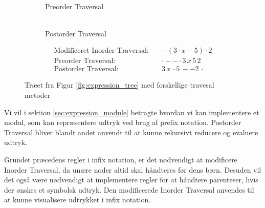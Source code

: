 \begin{figure}[H]
\begin{subfigure}{0.3\textwidth}
    \caption{\\Preorder Traversal}
  \end{subfigure}
  \hfill
  \begin{subfigure}{0.3\textwidth}
    \centering
    \caption{\\Postorder Traversal}
  \end{subfigure}
  \begin{align*}
      \text{Modificeret Inorder Traversal:} \quad & - (3 \cdot x - 5) \cdot 2 \\
      \text{Preorder Traversal:} \quad &  \cdot - - \cdot 3\, x\, 5\, 2  \\
      \text{Postorder Traversal:} \quad & 3\, x\, \cdot 5\, - -  2\, \cdot
  \end{align*}
  \caption{Træet fra Figur \ref{fig:expression_tree} med forskellige travesal metoder}
  \label{fig:expression_tree_traversal}
\end{figure}


Vi vil i sektion \ref{sec:expression_module} betragte hvordan vi kan implementere et modul, som kan repræsentere udtryk ved brug af prefix notation.
Postorder Traversal bliver blandt andet anvendt til at kunne rekursivt reducere og evaluere udtryk.

Grundet præcedens regler i infix notation, er det nødvendigt at modificere Inorder Traversal, da unære noder altid skal håndteres før dens børn. Desuden vil det også være nødvendigt at implementere regler for at håndtere parenteser, hvis der ønskes et symbolsk udtryk. Den modificerede Inorder Traversal anvendes til at kunne visualisere udtrykket i infix notation.


